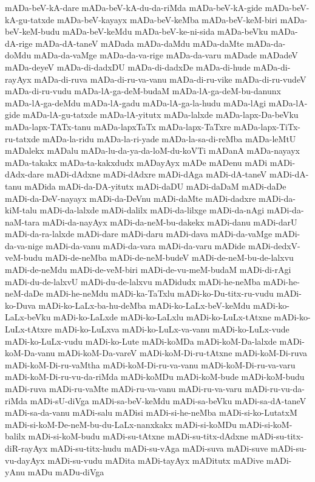 {mADa-beV-kA-dare
mADa-beV-kA-du-da-riMda
mADa-beV-kA-gide
mADa-beV-kA-gu-tatxde
mADa-beV-kayayx
mADa-beV-keMba
mADa-beV-keM-biri
mADa-beV-keM-budu
mADa-beV-keMdu
mADa-beV-ke-ni-sida
mADa-beVku
mADa-dA-rige
mADa-dA-taneV
mADada
mADa-daMdu
mADa-daMte
mADa-da-doMdu
mADa-da-vaMge
mADa-da-va-rige
mADa-da-varu
mADade
mADadeV
mADa-deyeV
mADa-di-dadxDU
mADa-di-dadxDe
mADa-di-hude
mADa-di-rayAyx
mADa-di-ruva
mADa-di-ru-va-vanu
mADa-di-ru-vike
mADa-di-ru-vudeV
mADa-di-ru-vudu
mADa-lA-ga-deM-budaM
mADa-lA-ga-deM-bu-danunx
mADa-lA-ga-deMdu
mADa-lA-gadu
mADa-lA-ga-la-hudu
mADa-lAgi
mADa-lA-gide
mADa-lA-gu-tatxde
mADa-lA-yitutx
mADa-lalxde
mADa-lapx-Da-beVku
mADa-lapx-TATx-tanu
mADa-lapxTaTx
mADa-lapx-TaTxre
mADa-lapx-TiTx-ru-tatxde
mADa-la-ridu
mADa-la-ri-yade
mADa-la-sa-di-reMba
mADa-leMtU
mADalekx
mADalu
mADa-lu-da-ya-da-loM-du-koVTi
mADanA
mADa-nayayx
mADa-takakx
mADa-ta-kakxdudx
mADayAyx
mADe
mADenu
mADi
mADi-dAdx-dare
mADi-dAdxne
mADi-dAdxre
mADi-dAga
mADi-dA-taneV
mADi-dA-tanu
mADida
mADi-da-DA-yitutx
mADi-daDU
mADi-daDaM
mADi-daDe
mADi-da-DeV-nayayx
mADi-da-DeVnu
mADi-daMte
mADi-dadxre
mADi-da-kiM-talu
mADi-da-lalxde
mADi-dalilx
mADi-da-lilxge
mADi-da-nAgi
mADi-da-naM-tara
mADi-da-nayAyx
mADi-da-neM-bu-dakekx
mADi-danu
mADi-darU
mADi-da-ra-lalxde
mADi-dare
mADi-daru
mADi-dava
mADi-da-vaMge
mADi-da-va-nige
mADi-da-vanu
mADi-da-vara
mADi-da-varu
mADide
mADi-dedxV-veM-budu
mADi-de-neMba
mADi-de-neM-budeV
mADi-de-neM-bu-de-lalxvu
mADi-de-neMdu
mADi-de-veM-biri
mADi-de-vu-meM-budaM
mADi-di-rAgi
mADi-du-de-lalxvU
mADi-du-de-lalxvu
mADidudx
mADi-he-neMba
mADi-he-neM-daDe
mADi-he-neMdu
mADi-ka-TaTxlu
mADi-ko-Du-titx-ru-vudu
mADi-ko-Duva
mADi-ko-LaLx-ba-hu-deMba
mADi-ko-LaLx-beV-keMdu
mADi-ko-LaLx-beVku
mADi-ko-LaLxde
mADi-ko-LaLxlu
mADi-ko-LuLx-tAtxne
mADi-ko-LuLx-tAtxre
mADi-ko-LuLxva
mADi-ko-LuLx-va-vanu
mADi-ko-LuLx-vude
mADi-ko-LuLx-vudu
mADi-ko-Lute
mADi-koMDa
mADi-koM-Da-lalxde
mADi-koM-Da-vanu
mADi-koM-Da-vareV
mADi-koM-Di-ru-tAtxne
mADi-koM-Di-ruva
mADi-koM-Di-ru-vaMtha
mADi-koM-Di-ru-va-vanu
mADi-koM-Di-ru-va-varu
mADi-koM-Di-ru-vu-da-riMda
mADi-koMDu
mADi-koM-bude
mADi-koM-budu
mADi-ruva
mADi-ru-vaMte
mADi-ru-va-vanu
mADi-ru-va-varu
mADi-ru-vu-da-riMda
mADi-sU-diVga
mADi-sa-beV-keMdu
mADi-sa-beVku
mADi-sa-dA-taneV
mADi-sa-da-vanu
mADi-salu
mADisi
mADi-si-he-neMba
mADi-si-ko-LutatxM
mADi-si-koM-De-neM-bu-du-LaLx-nanxkakx
mADi-si-koMDu
mADi-si-koM-balilx
mADi-si-koM-budu
mADi-su-tAtxne
mADi-su-titx-dAdxne
mADi-su-titx-diR-rayAyx
mADi-su-titx-hudu
mADi-su-vAga
mADi-suva
mADi-suve
mADi-su-vu-dayAyx
mADi-su-vudu
mADita
mADi-tayAyx
mADitutx
mADive
mADi-yAnu
mADu
mADu-diVga
}
